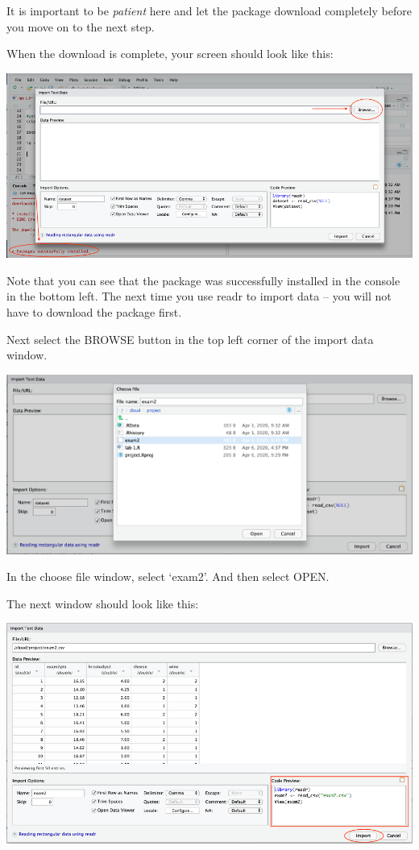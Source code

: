 \documentclass[
]{book}
\begin{document}
It is important to be \emph{patient} here and let the package download completely before you move on to the next step.

When the download is complete, your screen should look like this:

\includegraphics{img/importwindow.png}

Note that you can see that the package was successfully installed in the console in the bottom left. The next time you use readr to import data -- you will not have to download the package first.

Next select the BROWSE button in the top left corner of the import data window.

\includegraphics{img/importbrowse.png}

In the choose file window, select `exam2'. And then select OPEN.

The next window should look like this:

\includegraphics{img/importwindow2.png}
\end{document}
